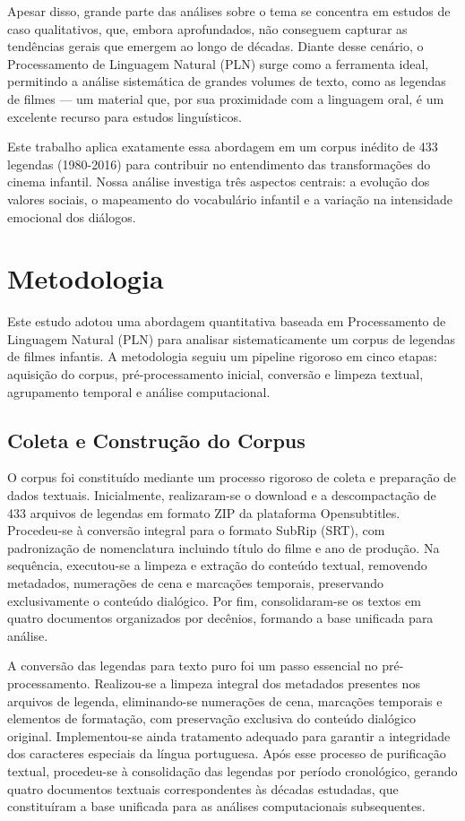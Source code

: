 \documentclass[twocolumn, 9pt]{article}
\begin{document}
Apesar disso, grande parte das análises sobre o tema se concentra em estudos de caso qualitativos, que, embora aprofundados, não conseguem capturar as tendências gerais que emergem ao longo de décadas.
Diante desse cenário, o Processamento de Linguagem Natural (PLN) surge como a ferramenta ideal, permitindo a análise sistemática de grandes volumes de texto, como as legendas de filmes — um material que, por sua proximidade com a linguagem oral, é um excelente recurso para estudos linguísticos.\cite{inproceedings8b3efc2c}

Este trabalho aplica exatamente essa abordagem em um corpus inédito de 433 legendas (1980-2016) para contribuir no entendimento das transformações do cinema infantil. Nossa análise investiga três aspectos centrais: a evolução dos valores sociais, o mapeamento do vocabulário infantil e a variação na intensidade emocional dos diálogos.
\section{Metodologia }
Este estudo adotou uma abordagem quantitativa baseada em Processamento de Linguagem Natural (PLN) para analisar sistematicamente um corpus de legendas de filmes infantis. A metodologia seguiu um pipeline rigoroso em cinco etapas: aquisição do corpus, pré-processamento inicial, conversão e limpeza textual, agrupamento temporal e análise computacional.

\subsection{Coleta e Construção do Corpus}
O corpus foi constituído mediante um processo rigoroso de coleta e preparação de dados textuais. Inicialmente, realizaram-se o download e a descompactação de 433 arquivos de legendas em formato ZIP da plataforma Opensubtitles. Procedeu-se à conversão integral para o formato SubRip (SRT), com padronização de nomenclatura incluindo título do filme e ano de produção. Na sequência, executou-se a limpeza e extração do conteúdo textual, removendo metadados, numerações de cena e marcações temporais, preservando exclusivamente o conteúdo dialógico. Por fim, consolidaram-se os textos em quatro documentos organizados por decênios, formando a base unificada para análise.

A conversão das legendas para texto puro foi um passo essencial no pré-processamento. Realizou-se a limpeza integral dos metadados presentes nos arquivos de legenda, eliminando-se numerações de cena, marcações temporais e elementos de formatação, com preservação exclusiva do conteúdo dialógico original. Implementou-se ainda tratamento adequado para garantir a integridade dos caracteres especiais da língua portuguesa. Após esse processo de purificação textual, procedeu-se à consolidação das legendas por período cronológico, gerando quatro documentos textuais correspondentes às décadas estudadas, que constituíram a base unificada para as análises computacionais subsequentes.
\end{document}
